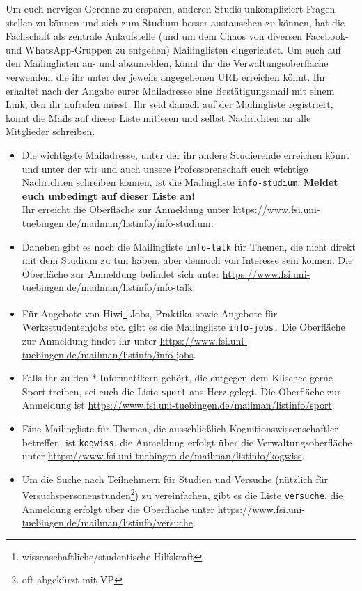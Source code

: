 Um euch nerviges Gerenne zu ersparen, anderen Studis unkompliziert Fragen stellen zu können und
sich zum Studium besser austauschen zu können, hat die Fachschaft als zentrale Anlaufstelle (und um dem Chaos von diversen Facebook- und WhatsApp-Gruppen zu entgehen) Mailinglisten eingerichtet. 
Um euch auf den Mailinglisten an- und abzumelden, könnt ihr die Verwaltungsoberfläche verwenden, die ihr unter der jeweils angegebenen URL erreichen könnt. Ihr erhaltet nach der Angabe eurer Mailadresse eine Bestätigungsmail mit einem Link, den ihr aufrufen müsst. Ihr seid danach auf der Mailingliste registriert, könnt die Mails auf dieser Liste mitlesen und selbst Nachrichten an alle Mitglieder schreiben.
\begin{itemize}
\item Die wichtigste Mailadresse, unter der ihr andere Studierende erreichen könnt und unter der wir und auch unsere Professorenschaft euch wichtige Nachrichten schreiben können, ist die Mailingliste \texttt{info-studium}. \textbf{Meldet euch unbedingt auf dieser Liste an!}\\
Ihr erreicht die Oberfläche zur Anmeldung unter \url{https://www.fsi.uni-tuebingen.de/mailman/listinfo/info-studium}.
\item Daneben gibt es noch die Mailingliste \texttt{info-talk} für Themen, die nicht direkt mit dem Studium
zu tun haben, aber dennoch von Interesse sein können. Die Oberfläche zur Anmeldung befindet sich unter \url{https://www.fsi.uni-tuebingen.de/mailman/listinfo/info-talk}.
\item Für Angebote von Hiwi\footnote{wissenschaftliche/studentische Hilfskraft}-Jobs, Praktika sowie Angebote für Werksstudentenjobs etc. gibt es die Mailingliste \texttt{info-jobs.} Die Oberfläche zur Anmeldung findet ihr unter \url{https://www.fsi.uni-tuebingen.de/mailman/listinfo/info-jobs}.
\item Falls ihr zu den *-Informatikern gehört, die entgegen dem Klischee gerne Sport treiben, sei euch die Liste \texttt{sport} ans Herz gelegt. Die Oberfläche zur Anmeldung ist \url{https://www.fsi.uni-tuebingen.de/mailman/listinfo/sport}. 
\ifkogwiss 
\item Eine Mailingliste für Themen, die ausschließlich Kognitionswissenschaftler betreffen, ist
\texttt{kogwiss}, die Anmeldung erfolgt über die Verwaltungsoberfläche unter \url{https://www.fsi.uni-tuebingen.de/mailman/listinfo/kogwiss}.
\item Um die Suche nach Teilnehmern für Studien und Versuche (nützlich für Versuchspersonenstunden\footnote{oft abgekürzt mit VP}) zu vereinfachen, gibt es die Liste \texttt{versuche}, 
die Anmeldung erfolgt über die Oberfläche unter \url{https://www.fsi.uni-tuebingen.de/mailman/listinfo/versuche}. 
\fi
\end{itemize}
